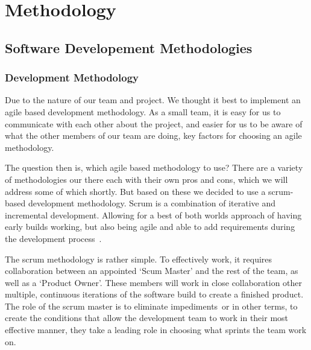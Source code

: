 \chapter{Methodology} \label{ch:methodology}
    \section{Software Developement Methodologies}
        \subsection{Development Methodology}
            Due to the nature of our team and project. We thought it best to implement an agile based development
            methodology. As a small team, it is easy for us to communicate with each other about the project, and easier
            for us to be aware of what the other members of our team are doing, key factors for choosing an agile
            methodology. 
            
            The question then is, which agile based methodology to use? There are a variety of
            methodologies our there each with their own pros and cons, which we will address some of which shortly. But
            based on these we decided to use a scrum-based development methodology. Scrum is a combination of iterative
            and incremental development. Allowing for a best of both worlds approach of having early builds working, but
            also being agile and able to add requirements during the development process~\cite{srivastava_2017_scrum}.
            
            The scrum methodology is rather simple. To effectively work, it requires collaboration between an appointed
            ‘Scum Master’ and the rest of the team, as well as a ‘Product Owner’. These members will work in close
            collaboration other multiple, continuous iterations of the software build to create a finished product. The
            role of the scrum master is to eliminate impediments~\cite{srivastava_2017_scrum}or in other terms, to
            create the conditions that allow the development team to work in their most effective manner, they take a
            leading role in choosing what sprints the team work on. 
            
